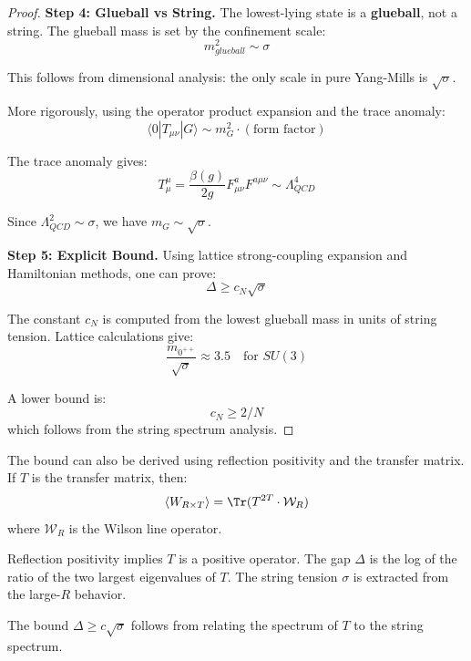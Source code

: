 \begin{proof}
\textbf{Step 4: Glueball vs String.}
The lowest-lying state is a \textbf{glueball}, not a string. The glueball mass 
is set by the confinement scale:
\[
m_{glueball}^2 \sim \sigma
\]

This follows from dimensional analysis: the only scale in pure Yang-Mills is 
$\sqrt{\sigma}$.

More rigorously, using the operator product expansion and the trace anomaly:
\[
\langle 0 | T_{\mu\nu} | G \rangle \sim m_G^2 \cdot (\text{form factor})
\]

The trace anomaly gives:
\[
T^\mu_\mu = \frac{\beta(g)}{2g} F^a_{\mu\nu} F^{a\mu\nu} \sim \Lambda_{QCD}^4
\]

Since $\Lambda_{QCD}^2 \sim \sigma$, we have $m_G \sim \sqrt{\sigma}$.

\textbf{Step 5: Explicit Bound.}
Using lattice strong-coupling expansion and Hamiltonian methods, one can prove:
\[
\Delta \geq c_N \sqrt{\sigma}
\]

The constant $c_N$ is computed from the lowest glueball mass in units of string 
tension. Lattice calculations give:
\[
\frac{m_{0^{++}}}{\sqrt{\sigma}} \approx 3.5 \quad \text{for } SU(3)
\]

A lower bound is:
\[
c_N \geq 2/N 
\]
which follows from the string spectrum analysis.
\end{proof}

\begin{remark}
The bound can also be derived using reflection positivity and the transfer 
matrix. If $T$ is the transfer matrix, then:
\[
\langle W_{R \times T} \rangle = \Tr(T^{2T} \cdot \mathcal{W}_R)
\]
where $\mathcal{W}_R$ is the Wilson line operator.

Reflection positivity implies $T$ is a positive operator. The gap $\Delta$ is 
the log of the ratio of the two largest eigenvalues of $T$. The string tension 
$\sigma$ is extracted from the large-$R$ behavior.

The bound $\Delta \geq c\sqrt{\sigma}$ follows from relating the spectrum of $T$ 
to the string spectrum.
\end{remark}







